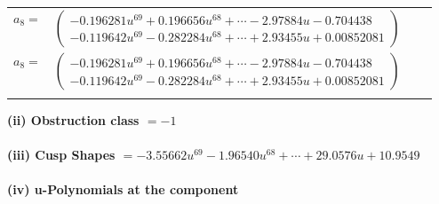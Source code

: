 \documentclass[1p]{elsarticle_modified}
\theoremstyle{definition}
\begin{document}
\begin{tabular}{m{7pt} m{180pt} m{7pt} m{180pt} }
\flushright $a_{8}=$&$\begin{pmatrix}-0.196281 u^{69}+0.196656 u^{68}+\cdots-2.97884 u-0.704438\\-0.119642 u^{69}-0.282284 u^{68}+\cdots+2.93455 u+0.00852081\end{pmatrix}$\\ \flushright $a_{8}=$&$\begin{pmatrix}-0.196281 u^{69}+0.196656 u^{68}+\cdots-2.97884 u-0.704438\\-0.119642 u^{69}-0.282284 u^{68}+\cdots+2.93455 u+0.00852081\end{pmatrix}$\\&\end{tabular}
\flushleft \textbf{(ii) Obstruction class $= -1$}\\~\\
\flushleft \textbf{(iii) Cusp Shapes $= -3.55662 u^{69}-1.96540 u^{68}+\cdots+29.0576 u+10.9549$}\\~\\
\newpage\renewcommand{\arraystretch}{1}
\flushleft \textbf{(iv) u-Polynomials at the component}\newline \\
\end{document}
